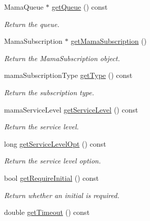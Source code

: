 \begin{CompactItemize}
Mama\-Queue $\ast$ \hyperlink{classWombat_1_1MamdaSubscription_8129a93c8b810dc9f7cf53c4c10afd49}{get\-Queue} () const 
\begin{CompactList}\small\item\em Return the queue. \item\end{CompactList}\item 
Mama\-Subscription $\ast$ \hyperlink{classWombat_1_1MamdaSubscription_fd44aa9380bd377b2934ccd64c58cfad}{get\-Mama\-Subscription} ()
\begin{CompactList}\small\item\em Return the Mama\-Subscription object. \item\end{CompactList}\item 
mama\-Subscription\-Type \hyperlink{classWombat_1_1MamdaSubscription_f6d6a708aa79d28640efaf31a80d05e7}{get\-Type} () const 
\begin{CompactList}\small\item\em Return the subscription type. \item\end{CompactList}\item 
mama\-Service\-Level \hyperlink{classWombat_1_1MamdaSubscription_256737c301cac3ccef868b715c37311f}{get\-Service\-Level} () const 
\begin{CompactList}\small\item\em Return the service level. \item\end{CompactList}\item 
long \hyperlink{classWombat_1_1MamdaSubscription_cceddcf7fb3bea35760c9b48d1e16389}{get\-Service\-Level\-Opt} () const 
\begin{CompactList}\small\item\em Return the service level option. \item\end{CompactList}\item 
bool \hyperlink{classWombat_1_1MamdaSubscription_41dd19a9721732dff1607338c23e45f8}{get\-Require\-Initial} () const 
\begin{CompactList}\small\item\em Return whether an initial is required. \item\end{CompactList}\item 
double \hyperlink{classWombat_1_1MamdaSubscription_2afe74ffded753f3501b844bd911c36b}{get\-Timeout} () const 

\end{CompactItemize}
